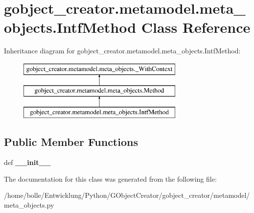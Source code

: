 \hypertarget{classgobject__creator_1_1metamodel_1_1meta__objects_1_1IntfMethod}{
\section{gobject\_\-creator.metamodel.meta\_\-objects.IntfMethod Class Reference}
\label{classgobject__creator_1_1metamodel_1_1meta__objects_1_1IntfMethod}
}
Inheritance diagram for gobject\_\-creator.metamodel.meta\_\-objects.IntfMethod:\begin{figure}[H]
\begin{center}
\leavevmode
\includegraphics[height=3cm]{classgobject__creator_1_1metamodel_1_1meta__objects_1_1IntfMethod}
\end{center}
\end{figure}
\subsection*{Public Member Functions}
\begin{DoxyCompactItemize}
\item 
\hypertarget{classgobject__creator_1_1metamodel_1_1meta__objects_1_1IntfMethod_abbaa51c4459aa146916e482251c3cbe5}{
def {\bfseries \_\-\_\-init\_\-\_\-}}
\label{classgobject__creator_1_1metamodel_1_1meta__objects_1_1IntfMethod_abbaa51c4459aa146916e482251c3cbe5}

\end{DoxyCompactItemize}


The documentation for this class was generated from the following file:\begin{DoxyCompactItemize}
\item 
/home/bolle/Entwicklung/Python/GObjectCreator/gobject\_\-creator/metamodel/meta\_\-objects.py\end{DoxyCompactItemize}
